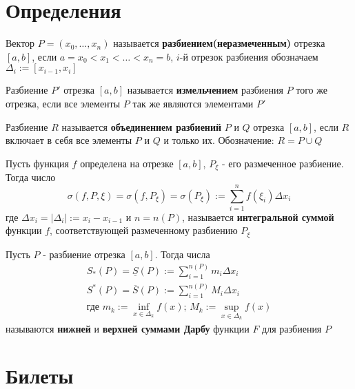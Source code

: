 \documentclass[10pt]{article}
\begin{document}
    \tableofcontents
    \section{Определения}
    \begin{definition}
        Вектор $P = (x_0, \ldots, x_n)$ называется \textbf{разбиением(неразмеченным)} отрезка $[a, b]$, если $a = x_0 < x_1 < \ldots < x_n = b$, $i$-й отрезок разбиения обозначаем $\Delta_i := [x_{i-1}, x_i]$  
    \end{definition}
    \begin{definition}
        Разбиение $P'$ отрезка $[a, b]$ называется \textbf{измельчением} разбиения $P$ того же отрезка, если все элементы $P$ так же являются элементами $P'$
    \end{definition}
    \begin{definition}
        Разбиение $R$ называется \textbf{объединением разбиений} $P$ и $Q$ отрезка $[a, b]$, если $R$ включает в себя все элементы $P$ и $Q$ и только их. Обозначение: $R = P \cup Q$
    \end{definition}
    \begin{definition}
        Пусть функция $f$ определена на отрезке $[a, b]$, $P_{\xi}$ - его размеченное разбиение. Тогда число
        $$
        \sigma(f, P, \xi) = \sigma(f, P_{\xi}) = \sigma(P_{\xi}) := \sum_{i=1}^n f(\xi_i)\Delta x_i
        $$
        где $\Delta x_i = |\Delta_i| := x_i - x_{i-1}$ и $n = n(P)$, называется \textbf{интегральной суммой} функции $f$, соответствующей размеченному разбиению $P_{\xi}$
    \end{definition}
    \begin{definition}
        Пусть $P$ - разбиение отрезка $[a, b]$. Тогда числа
        \begin{gather*}
            S_{*}(P) = \underline{S}(P) := \sum_{i = 1}^{n(P)} m_i \Delta x_i \\
            S^{*}(P) = \overline{S}(P) := \sum_{i = 1}^{n(P)}M_i \Delta x_i\\
            \text{где }m_k := \inf_{x \in \Delta_k}f(x);\, M_k := \sup_{x \in \Delta_k}f(x)
        \end{gather*}
        называются \textbf{нижней} и \textbf{верхней суммами Дарбу} функции $F$ для разбиения $P$ 
    \end{definition}
    \section{Билеты}
\end{document}
